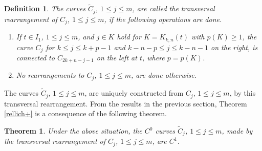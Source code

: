 \documentclass[final,a4paper]{jmsj}
\theoremstyle{thmstyleone}%
\newtheorem{theorem}{Theorem}
\theoremstyle{thmstyletwo}%
\theoremstyle{thmstylethree}%
\newtheorem{definition}{Definition}%
\begin{document}
\begin{definition}\label{transversal}  
The curves $\tilde C_j$, $1\leq j\leq m$, are called the transversal rearrangement of $C_j $, $1\leq j\leq m$, if the following operations are done. 
\begin{enumerate} 
\item If $t\in I_1$, $1\leq j\leq m$, and $j\in K$ hold for $K=K_{k,n}(t)$ with $p(K)\geq 1$, the curve $C_j$ for $k\leq j\leq k+p-1$ and $k-n-p\leq j\leq k-n-1$ on the right, is connected to $C_{2k+n-j-1}$ on the left at $t$, where $p=p(K)$. 
\item No rearrangements to $C_j$, $1\leq j\leq m$, are done otherwise.  
\end{enumerate} 
\end{definition} 

The curves $\tilde C_j$, $1\leq j\leq m$, are uniquely constructed from $C_j$, $1\leq j\leq m$, by this transversal rearrangement. From  the results in the previous section, Theorem \ref{rellich+} is a consequence of the following theorem. 

\begin{theorem}\label{c1theorem}
Under the above situation, the $C^0$ curves $\tilde C_j$, $1\leq j\leq m$, made by the transversal rearrangement of $C_j$, $1\leq j\leq m$, are $C^1$.  
\end{theorem} 
\end{document}
